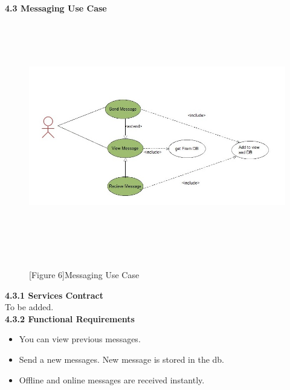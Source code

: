 \documentclass[29pt,a4paper]{moderncv}
\begin{document}
\newpage
	\\ \left\textbf{4.3 Messaging Use Case} \\
		\begin{figure}
			\centering
			\\ \includegraphics[width=6.0in, height=3.5in]{./messagingUseCase.jpg}
			\\\caption{[Figure 6]Messaging Use Case}\\
		\end{figure}

		\noindent\textbf{4.3.1 Services Contract}\\
		To be added.\\
		
		\noindent\textbf{4.3.2 Functional Requirements}
			\begin{itemize}
				\item You can view previous messages.
				\item Send a new messages. New message is stored in the db.
				\item Offline and online messages are received instantly.
			\end{itemize}
			
\end{document}
